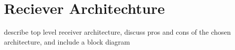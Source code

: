 \section{Reciever Architechture}
describe top level receiver architecture, discuss pros and cons of the chosen architecture, and include a block diagram